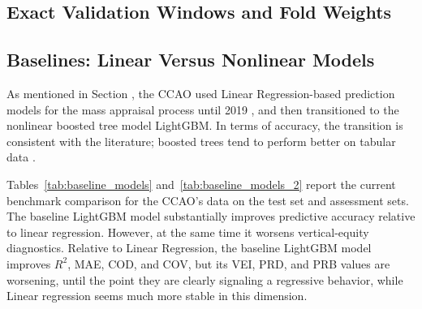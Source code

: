 \documentclass[12pt, draft]{article}
\theoremstyle{plain}
\theoremstyle{definition}
\newcommand{\1}{\mathbf{1}}
\begin{document}
\subsection{Exact Validation Windows and Fold Weights}


\begin{table}[!ht]
\centering
\caption{Placeholder for exact validation-window construction.}
\label{tab:fold_definition_placeholder}
\end{table}

\subsection{Baselines: Linear Versus Nonlinear Models}


As mentioned in Section , the CCAO used Linear Regression-based prediction models for the mass appraisal process until 2019 , and then transitioned to the nonlinear boosted tree model LightGBM. In terms of accuracy, the transition is consistent with the literature; boosted trees tend to perform better on tabular data . 

Tables~\ref{tab:baseline_models} and~\ref{tab:baseline_models_2} report the current benchmark comparison for the CCAO's data on the test set and assessment sets. The baseline LightGBM model substantially improves predictive accuracy relative to linear regression. However, at the same time it worsens vertical-equity diagnostics. Relative to Linear Regression, the baseline LightGBM model improves \(R^2\), MAE, COD, and COV, but its VEI, PRD, and PRB values are worsening, until the point they are clearly signaling a regressive behavior, while Linear regression seems much more stable in this dimension.
\end{document}
